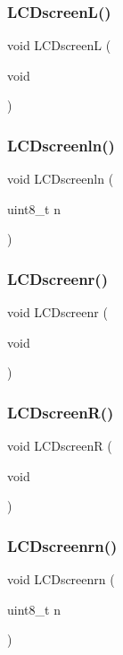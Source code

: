 \subsubsection{L\+C\+Dscreen\+L()}
{\footnotesize\ttfamily void L\+C\+DscreenL (\begin{DoxyParamCaption}\item[{void}]{ }\end{DoxyParamCaption})}

\mbox{\label{lcd_8c_a59b384aec0b69fd7fd37a987cc17c96c}} 
\subsubsection{L\+C\+Dscreenln()}
{\footnotesize\ttfamily void L\+C\+Dscreenln (\begin{DoxyParamCaption}\item[{uint8\+\_\+t}]{n }\end{DoxyParamCaption})}

\mbox{\label{lcd_8c_a724ac0845f7d9f796cb6dd76720ba02a}} 
\subsubsection{L\+C\+Dscreenr()}
{\footnotesize\ttfamily void L\+C\+Dscreenr (\begin{DoxyParamCaption}\item[{void}]{ }\end{DoxyParamCaption})}

\mbox{\label{lcd_8c_a0a2ea7dcbd033ca160b8dfb8c824bbc9}} 
\subsubsection{L\+C\+Dscreen\+R()}
{\footnotesize\ttfamily void L\+C\+DscreenR (\begin{DoxyParamCaption}\item[{void}]{ }\end{DoxyParamCaption})}

\mbox{\label{lcd_8c_a147566ab526ea48cd3dc0c5bd6596722}} 
\subsubsection{L\+C\+Dscreenrn()}
{\footnotesize\ttfamily void L\+C\+Dscreenrn (\begin{DoxyParamCaption}\item[{uint8\+\_\+t}]{n }\end{DoxyParamCaption})}

